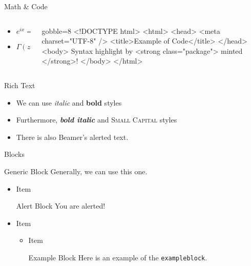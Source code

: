 \documentclass[14pt,t,hyperref={pdfencoding=auto}]{beamer}
\begin{document}
\begin{frame}[fragile]{Math \& Code}
  \begin{columns}
    \begin{column}{0.5\textwidth}
      \begin{itemize}
      \item $e^{ix} = \cos x + i \sin x$
      \item $\Gamma(z) = \int_0^\infty t^{z-1} e^{-t} dt$
      \end{itemize}
    \end{column}
    \begin{column}{0.5\textwidth}
      \begin{html*}{gobble=8}
        <!DOCTYPE html>
        <html>
          <head>
            <meta charset="UTF-8" />
            <title>Example of Code</title>
          </head>
          <body>
            Syntax highlight by
            <strong class="package">
              minted
            </strong>!
          </body>
        </html>
      \end{html*}
    \end{column}
  \end{columns}
\end{frame}


\begin{frame}{Rich Text}
  \begin{itemize}
  \item We can use \textit{italic} and \textbf{bold} styles
  \item Furthermore, \textit{\textbf{bold italic}} and \textsc{Small Capital} styles
  \item There is also Beamer's \alert{alerted text}.
  \end{itemize}
\end{frame}


\begin{frame}[fragile]{Blocks}
  \begin{block}{Generic Block}
    Generally, we can use this one.
  \end{block}

  \begin{itemize}
    \item Item
      \begin{alertblock}{Alert Block}
        You are alerted!
      \end{alertblock}
    \item Item
      \begin{itemize}
        \item Item
          \begin{exampleblock}{Example Block}
            Here is an example of the \verb|exampleblock|.
          \end{exampleblock}
      \end{itemize}
  \end{itemize}
\end{frame}
\end{document}
